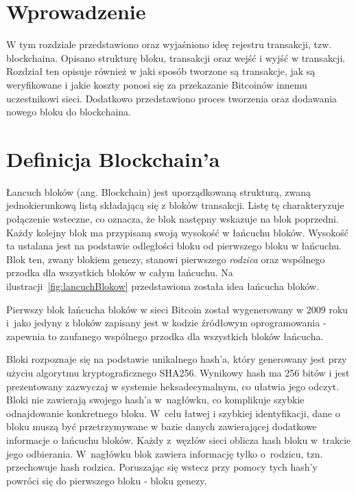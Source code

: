 \documentclass[12pt, twoside, final, openany]{mgr}
\begin{document}
\section{Wprowadzenie}
\indent W tym rozdziale przedstawiono oraz wyjaśniono ideę rejestru transakcji, tzw. blockchaina. Opisano strukturę bloku, transakcji oraz wejść i wyjść w transakcji. Rozdział ten opisuje również w jaki sposób tworzone są transakcje, jak są weryfikowane i jakie koszty ponosi się za przekazanie Bitcoinów innemu uczestnikowi sieci. Dodatkowo przedstawiono proces tworzenia oraz dodawania nowego bloku do blockchaina. 

\section{Definicja Blockchain'a}
\label{definicjaBlockchaina}
\indent Łancuch bloków (ang. Blockchain) jest uporządkowaną strukturą, zwaną jednokierunkową listą składającą się z bloków transakcji. Listę tę charakteryzuje połączenie wsteczne, co oznacza, że blok następny wskazuje na blok poprzedni. Każdy kolejny blok ma przypisaną swoją wysokość w łańcuchu bloków. Wysokość ta ustalana jest na podstawie odległości bloku od pierwszego bloku w łańcuchu. Blok ten, zwany blokiem genezy, stanowi pierwszego \textit{rodzica} oraz wspólnego przodka dla wszystkich bloków w całym łańcuchu\cite{BitcoinAndCryptocurrencyTechnologies, BlockchainExplained, BitcoinAndTheBlockchain}. Na ilustracji~\ref{fig:lancuchBlokow} przedstawiona została idea łańcucha bloków.

\indent Pierwszy blok łańcucha bloków w sieci Bitcoin został wygenerowany w 2009 roku i~jako jedyny z bloków zapisany jest w kodzie źródłowym oprogramowania - zapewnia to zaufanego wspólnego przodka dla wszystkich bloków łańcucha.

\indent Bloki rozpoznaje się na podstawie unikalnego hash'a, który generowany jest przy użyciu algorytmu kryptograficznego SHA256\cite{sha2}. Wynikowy hash ma 256 bitów i jest prezentowany zazwyczaj w systemie heksadecymalnym, co ułatwia jego odczyt. Bloki nie zawierają swojego hash'a w~nagłówku, co komplikuje szybkie odnajdowanie konkretnego bloku. W~celu łatwej i szybkiej identyfikacji, dane o bloku muszą być przetrzymywane w bazie danych zawierającej dodatkowe informacje o łańcuchu bloków. Każdy z~węzłów sieci oblicza hash bloku w~trakcie jego odbierania. W~nagłówku blok zawiera informację tylko o~rodzicu, tzn. przechowuje hash rodzica. Poruszając się wstecz przy pomocy tych hash'y powróci się do pierwszego bloku - bloku genezy. 
\end{document}
